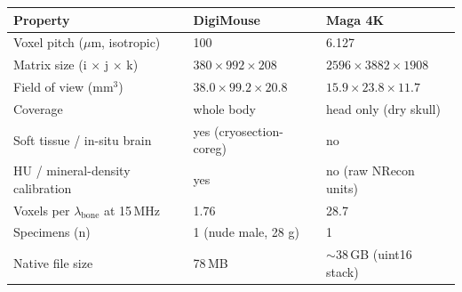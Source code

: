\begin{tabular}{lll}
\toprule
Property & DigiMouse & Maga 4K \\
\midrule
Voxel pitch ($\mu$m, isotropic) & 100 & 6.127 \\
Matrix size (i $\times$ j $\times$ k) & $380 \times 992 \times 208$ & $2596 \times 3882 \times 1908$ \\
Field of view (mm$^3$) & $38.0 \times 99.2 \times 20.8$ & $15.9 \times 23.8 \times 11.7$ \\
Coverage & whole body & head only (dry skull) \\
Soft tissue / in-situ brain & yes (cryosection-coreg) & no \\
HU / mineral-density calibration & yes & no (raw NRecon units) \\
Voxels per $\lambda_{\mathrm{bone}}$ at 15\,MHz & 1.76 & 28.7 \\
Specimens (n) & 1 (nude male, 28 g) & 1 \\
Native file size & 78\,MB & $\sim$38\,GB (uint16 stack) \\
\bottomrule
\end{tabular}
